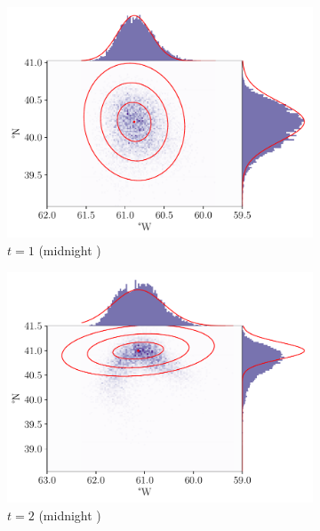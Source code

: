\begin{figure}
	\centering
	\begin{subfigure}{0.49\textwidth}
		\includegraphics[width=\textwidth]{chp06_applications/figures/gulf_stream/traj_stoch_em_1.0}
		\caption{\(t = 1\) (midnight )}
	\end{subfigure}
	\begin{subfigure}{0.49\textwidth}
		\includegraphics[width=\textwidth]{chp06_applications/figures/gulf_stream/traj_stoch_em_2.0}
		\caption{\(t = 2\) (midnight )}
	\end{subfigure}
	\begin{subfigure}{0.49\textwidth}

\end{subfigure}
\end{figure}
